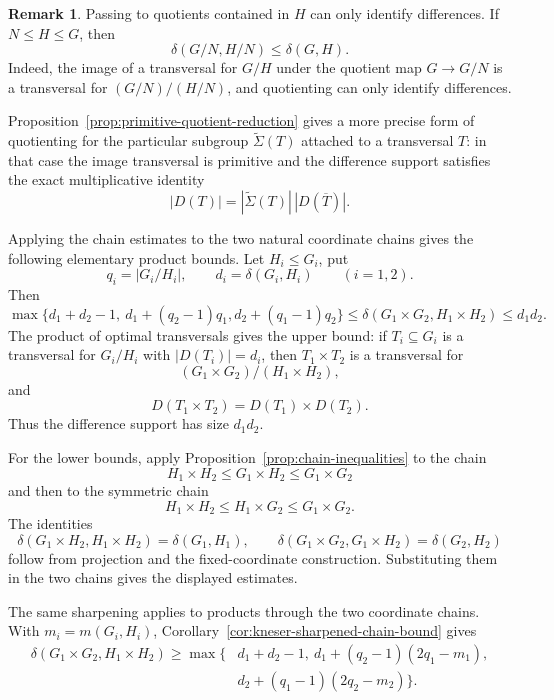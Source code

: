 \documentclass[reqno]{amsart}
\numberwithin{equation}{section}
\theoremstyle{definition}
\newtheorem{remark}[theorem]{Remark}
\begin{document}
\begin{remark}
Passing to quotients contained in $H$ can only identify differences.  If
$N\leq H\leq G$, then
\[
  \delta(G/N,H/N)\leq \delta(G,H).
\]
Indeed, the image of a transversal for \(G/H\) under the quotient map
\(G\to G/N\) is a transversal for \((G/N)/(H/N)\), and quotienting can only
identify differences.

Proposition~\ref{prop:primitive-quotient-reduction} gives a more precise form of
quotienting for the particular subgroup $\widetilde\Sigma(T)$ attached to a
transversal $T$: in that case the image transversal is primitive and the
difference support satisfies the exact multiplicative identity
\[
  |D(T)|=|\widetilde\Sigma(T)|\,|D(\overline T)|.
\]
\end{remark}

Applying the chain estimates to the two natural coordinate chains gives the
following elementary product bounds.
Let $H_i\leq G_i$, put
\[
  q_i=|G_i/H_i|,
  \qquad d_i=\delta(G_i,H_i)
  \qquad (i=1,2).
\]
Then
\begin{equation} \label{eq:bound-dir-products}
\max\{d_1+d_2-1,\ d_1+(q_2-1)q_1,d_2+(q_1-1)q_2\}\leq  \delta(G_1\times G_2,H_1\times H_2)\leq d_1d_2.
\end{equation}
The product of optimal transversals gives the upper bound: if
$T_i\subseteq G_i$ is a transversal for $G_i/H_i$ with $|D(T_i)|=d_i$, then
$T_1\times T_2$ is a transversal for
\[
  (G_1\times G_2)/(H_1\times H_2),
\]
and
\[
  D(T_1\times T_2)=D(T_1)\times D(T_2).
\]
Thus the difference support has size $d_1d_2$.

For the lower bounds, apply Proposition~\ref{prop:chain-inequalities} to the
chain
\[
  H_1\times H_2\leq G_1\times H_2\leq G_1\times G_2
\]
and then to the symmetric chain
\[
  H_1\times H_2\leq H_1\times G_2\leq G_1\times G_2.
\]
The identities
\[
  \delta(G_1\times H_2,H_1\times H_2)=\delta(G_1,H_1),
  \qquad
  \delta(G_1\times G_2,G_1\times H_2)=\delta(G_2,H_2)
\]
follow from projection and the fixed-coordinate construction.  Substituting
them in the two chains gives the displayed estimates.

The same sharpening applies to products through the two coordinate chains.
With \(m_i=m(G_i,H_i)\), Corollary~\ref{cor:kneser-sharpened-chain-bound}
gives
\[
\begin{split}
  \delta(G_1\times G_2,H_1\times H_2)
  \geq \max\{&d_1+d_2-1,\ d_1+(q_2-1)(2q_1-m_1),\\
              &d_2+(q_1-1)(2q_2-m_2)\}.
\end{split}
\]
\end{document}
